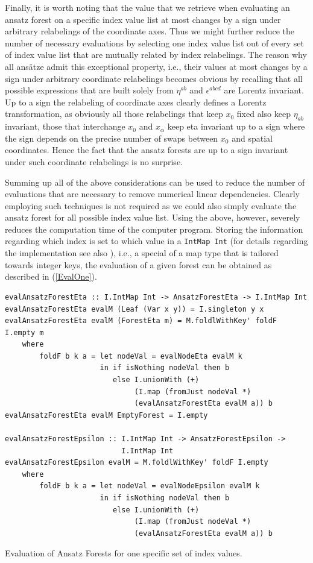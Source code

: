 \documentclass[a4paper,12pt, DIV=14, BCOR=5mm, twoside, headsepline, numbers=noenddot]{scrbook}
\begin{document}
Finally, it is worth noting that the value that we retrieve when evaluating an ansatz forest on a specific index value list at most changes by a sign under arbitrary relabelings of the coordinate axes. Thus we might further reduce the number of necessary evaluations by selecting one index value list out of every set of index value list that are mutually related by index relabelings. The reason why all ansätze admit this exceptional property, i.e., their values at most changes by a sign under arbitrary coordinate relabelings becomes obvious by recalling that all possible expressions that are built solely from $\eta^{ab}$ and $\epsilon^{abcd}$ are Lorentz invariant. Up to a sign the relabeling of coordinate axes clearly defines a Lorentz transformation, as obviously all those relabelings that keep $x_0$ fixed also keep $\eta_{ab}$ invariant, those that interchange $x_0$ and $x_{\alpha}$ keep eta invariant up to a sign where the sign depends on the precise number of swaps between $x_0$ and spatial coordinates. Hence the fact that the ansatz forests are up to a sign invariant under such coordinate relabelings is no surprise. 

Summing up all of the above considerations can be used to reduce the number of evaluations that are necessary to remove numerical linear dependencies. Clearly employing such techniques is not required as we could also simply evaluate the ansatz forest for all possible index value list. Using the above, however, severely reduces the computation time of the computer program. 
Storing the information regarding which index is set to which value in a \texttt{IntMap Int} \cite{HackageIntMap} (for details regarding the implementation see also \cite{Okasaki98fastmergeable}), i.e., a special of a map type that is tailored towards integer keys, the evaluation of a given forest can be obtained as described in (\ref{EvalOne}).
\begin{listing}[hbt!]
\begin{verbatim}
evalAnsatzForestEta :: I.IntMap Int -> AnsatzForestEta -> I.IntMap Int
evalAnsatzForestEta evalM (Leaf (Var x y)) = I.singleton y x
evalAnsatzForestEta evalM (ForestEta m) = M.foldlWithKey' foldF I.empty m
    where
        foldF b k a = let nodeVal = evalNodeEta evalM k
                      in if isNothing nodeVal then b
                         else I.unionWith (+)
                              (I.map (fromJust nodeVal *)
                              (evalAnsatzForestEta evalM a)) b
evalAnsatzForestEta evalM EmptyForest = I.empty

evalAnsatzForestEpsilon :: I.IntMap Int -> AnsatzForestEpsilon ->
                           I.IntMap Int
evalAnsatzForestEpsilon evalM = M.foldlWithKey' foldF I.empty
    where
        foldF b k a = let nodeVal = evalNodeEpsilon evalM k
                      in if isNothing nodeVal then b
                         else I.unionWith (+) 
                              (I.map (fromJust nodeVal *)
                              (evalAnsatzForestEta evalM a)) b  
\end{verbatim} 
\caption{Evaluation of Ansatz Forests for one specific set of index values.}\label{EvalOne}
\end{listing}
\end{document}
